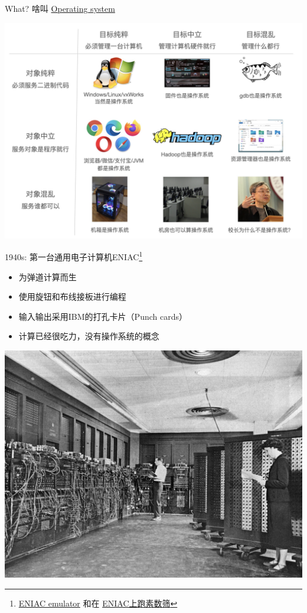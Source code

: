 \documentclass[aspectratio=1610]{beamer}
\begin{document}
\begin{frame}{What?}
    啥叫 \href{https://en.wikipedia.org/wiki/Operating_system}{Operating system}
    \begin{minipage}{\textwidth}
        \centering
        \includegraphics[height=0.5\textwidth]{pic/os-classify.jpg}
    \end{minipage}
\end{frame}

\begin{frame}{1940s: 第一台通用电子计算机ENIAC\footnote{\href{https://www.cs.drexel.edu/~bls96/eniac/}{ENIAC emulator} 和在 \href{https://jyywiki.cn/pages/OS/2022/demos/sieve.e}{ENIAC上跑素数筛}}}
    \begin{itemize}
        \item 为弹道计算而生
        \item 使用旋钮和布线接板进行编程
        \item 输入输出采用IBM的打孔卡片（Punch cards）
        \item 计算已经很吃力，没有操作系统的概念
    \end{itemize}
    \begin{minipage}{\textwidth}
        \centering
        \includegraphics[height=0.32\textwidth]{pic/ENIAC.jpg}
    \end{minipage}
\end{frame}
\end{document}
